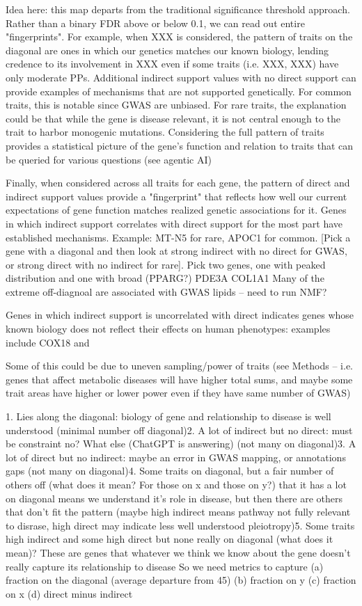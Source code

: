 \documentclass[sn-nature,lineno]{sn-jnl}%
\theoremstyle{thmstyleone}%
\theoremstyle{thmstyletwo}%
\theoremstyle{thmstylethree}%
\begin{document}
Idea here: this map departs from the traditional significance threshold approach. Rather than a binary FDR above or below 0.1, we can read out entire "fingerprints". For example, when XXX is considered, the pattern of traits on the diagonal are ones in which our genetics matches our known biology, lending credence to its involvement in XXX even if some traits (i.e. XXX, XXX) have only moderate PPs. Additional indirect support values with no direct support can provide examples of mechanisms that are not supported genetically. For common traits, this is notable since GWAS are unbiased. For rare traits, the explanation could be that while the gene is disease relevant, it is not central enough to the trait to harbor monogenic mutations. Considering the full pattern of traits provides a statistical picture of the gene's function and relation to traits that can be queried for various questions (see agentic AI)

Finally, when considered across all traits for each gene, the pattern of direct and indirect support values provide a "fingerprint" that reflects how well our current expectations of gene function matches realized genetic associations for it. Genes in which indirect support correlates with direct support for the most part have established mechanisms. Example: MT-N5 for rare, APOC1 for common. [Pick a gene with a diagonal and then look at strong indirect with no direct for GWAS, or strong direct with no indirect for rare]. Pick two genes, one with peaked distribution and one with broad (PPARG?)
PDE3A
COL1A1
Many of the extreme off-diagnoal are associated with GWAS lipids -- need to run NMF?

Genes in which indirect support is uncorrelated with direct indicates genes whose known biology does not reflect their effects on human phenotypes: examples include COX18 and 

Some of this could be due to uneven sampling/power of traits (see Methods -- i.e. genes that affect metabolic diseases will have higher total sums, and maybe some trait areas have higher or lower power even if they have same number of GWAS)

1. Lies along the diagonal: biology of gene and relationship to disease is well understood (minimal number off diagonal)2. A lot of indirect but no direct: must be constraint no? What else (ChatGPT is answering) (not many on diagonal)3. A lot of direct but no indirect: maybe an error in GWAS mapping, or annotations gaps (not many on diagonal)4. Some traits on diagonal, but a fair number of others off (what does it mean? For those on x and those on y?) that it has a lot on diagonal means we understand it's role in disease, but then there are others that don't fit the pattern (maybe high indirect means pathway not fully relevant to disrase, high direct may indicate less well understood pleiotropy)5. Some traits high indirect and some high direct but none really on diagonal (what does it mean)? These are genes that whatever we think we know about the gene doesn't really capture its relationship to disease
So we need metrics to capture (a) fraction on the diagonal (average departure from 45) (b) fraction on y (c) fraction on x (d) direct minus indirect
\end{document}
